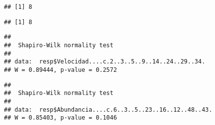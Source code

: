\documentclass[
]{article}
\newenvironment{Shaded}{\begin{snugshade}}{\end{snugshade}}
\newcommand{\CommentTok}[1]{\textcolor[rgb]{0.56,0.35,0.01}{\textit{#1}}}
\newcommand{\DecValTok}[1]{\textcolor[rgb]{0.00,0.00,0.81}{#1}}
\newcommand{\FloatTok}[1]{\textcolor[rgb]{0.00,0.00,0.81}{#1}}
\newcommand{\FunctionTok}[1]{\textcolor[rgb]{0.13,0.29,0.53}{\textbf{#1}}}
\newcommand{\NormalTok}[1]{#1}
\newcommand{\SpecialCharTok}[1]{\textcolor[rgb]{0.81,0.36,0.00}{\textbf{#1}}}
\begin{document}
\begin{Shaded}
\end{Shaded}

\begin{verbatim}
## [1] 8
\end{verbatim}

\begin{Shaded}
\end{Shaded}

\begin{verbatim}
## [1] 8
\end{verbatim}

\begin{Shaded}
\end{Shaded}

\begin{verbatim}
## 
##  Shapiro-Wilk normality test
## 
## data:  resp$Velocidad....c.2..3..5..9..14..24..29..34.
## W = 0.89444, p-value = 0.2572
\end{verbatim}

\begin{Shaded}
\end{Shaded}

\begin{verbatim}
## 
##  Shapiro-Wilk normality test
## 
## data:  resp$Abundancia....c.6..3..5..23..16..12..48..43.
## W = 0.85403, p-value = 0.1046
\end{verbatim}
\end{document}
